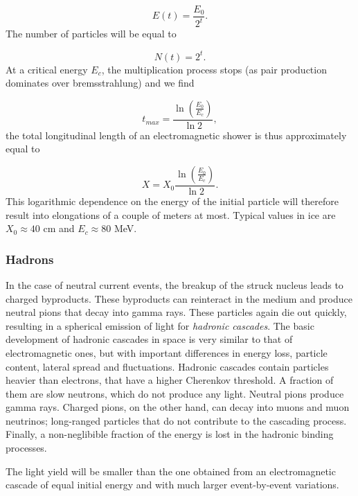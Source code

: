 \begin{equation}
E(t) = \frac{E_0}{2^t}.
\end{equation}
The number of particles will be equal to

\begin{equation}
N(t) = 2^t.
\end{equation}
At a critical energy $E_c$, the multiplication process stops (as pair production dominates over bremsstrahlung) and we find

\begin{equation}
t_{max} = \frac{\ln\left(\frac{E_0}{E_c}\right)}{\ln 2},
\end{equation}
the total longitudinal length of an electromagnetic shower is thus approximately equal to

\begin{equation}
X = X_0 \frac{\ln\left(\frac{E_0}{E_c}\right)}{\ln 2}.
\end{equation}
This logarithmic dependence on the energy of the initial particle will therefore result into elongations of a couple of meters at most. Typical values in ice are $X_0 \approx 40$ cm and $E_c \approx 80$ MeV.

\subsubsection{Hadrons}
In the case of neutral current events, the breakup of the struck nucleus leads to charged byproducts. These byproducts can reinteract in the medium and produce neutral pions that decay into gamma rays. These particles again die out quickly, resulting in a spherical emission of light for \textit{hadronic cascades}. The basic development of hadronic cascades in space is very similar to that of electromagnetic ones, but with important differences in energy loss, particle content, lateral spread and fluctuations. Hadronic cascades contain particles heavier than electrons, that have a higher Cherenkov threshold. A fraction of them are slow neutrons, which do not produce any light. Neutral pions produce gamma rays. Charged pions, on the other hand, can decay into muons and muon neutrinos; long-ranged particles that do not contribute to the cascading process. Finally, a non-neglibible fraction of the energy is lost in the hadronic binding processes.

The light yield will be smaller than the one obtained from an electromagnetic cascade of equal initial energy and with much larger event-by-event variations. 



